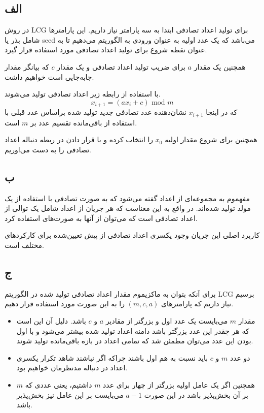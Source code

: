 \subsection*{الف}
در روش
LCG
برای تولید اعداد تصادفی ابتدا به سه پارامتر نیاز داریم. این پارامترها شامل بذر یا
seed
می‌باشد که یک عدد اولیه به عنوان ورودی به الگوریتم می‌دهیم تا به عنوان نقطه شروع برای تولید اعداد تصادفی مورد استفاده قرار گیرد.

همچنین یک مقدار
$a$
برای ضریب تولید اعداد تصادفی و یک مقدار
$c$
که بیانگر مقدار جابه‌جایی است خواهیم داشت.

با استفاده از رابطه زیر اعداد تصادفی تولید می‌شوند.
\[
x_{i + 1} = (a x_{i} + c) \,\, \text{mod} \,\, m    
\]
که در اینجا
$x_{i + 1}$
نشان‌دهنده عدد تصادفی جدید تولید شده براساس عدد قبلی با استفاده از باقی‌مانده تقسیم عدد بر
$m$
است.

همچنین برای شروع مقدار اولیه
$x_0$
را انتخاب کرده و با قرار دادن در ربطه دنباله اعداد تصادفی را به دست می‌اوریم.

\subsection*{ب}
مفهموم
به مجموعه‌ای از اعداد گفته می‌شود که به صورت تصادفی با استفاده از یک مولد تولید شده‌اند. در واقع به این معناست که هر جریان از اعداد شامل یک توالی از اعداد تصادفی است که می‌توان از آنها به صورت‌های استفاده کرد.

کاربرد اصلی این جریان وجود یکسری اعداد تصادفی از پیش تعیین‌شده برای کارکردهای مختلف است.

\subsection*{ج}
برای آنکه بتوان به ماکزیموم مقدار اعداد تصادفی تولید شده در الگوریتم
LCG
برسیم نیاز داریم که پارامتر‌های
$(m, c, a)$
را به این صورت مورد استفاده قرار دهیم.
\begin{itemize}
    \item
    مقدار
    $m$
    می‌بایست یک عدد اول و بزرگتر از مقادیر
    $a$
    و
    $c$
    باشد. دلیل آن این است که هر چقدر این عدد بزرگتر باشد دامنه اعداد تولید شده بیشتر می‌شود و با اول بودن این عدد می‌توان مطمئن شد که تمامی اعداد در بازه باقی‌مانده تولید شوند.

    \item
    دو عدد
    $m$
    و 
    $c$
    باید نسبت به هم اول باشند چراکه اگر نباشند شاهد تکرار یکسری اعداد در دنباله مدنظرمان خواهیم بود.

    \item
    همچنین اگر یک عامل اولیه بزرگتر از چهار برای عدد
    $m$
    داشتیم، یعنی عددی که 
    $m$
    بر آن بخش‌پذیر باشد در این صورت
    $a - 1$
    می‌بایست بر این عامل نیز بخش‌پذیر باشد.
\end{itemize}


